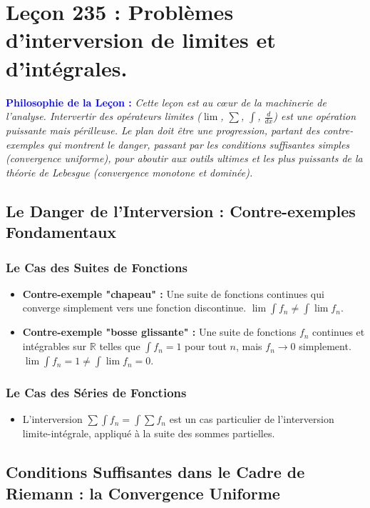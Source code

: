 \documentclass[12pt, a4paper, parskip=full]{report}
\theoremstyle{agregstyle}
\newenvironment{philosophie}
  {\par\medskip\noindent\begin{oframed}\noindent\textbf{\textcolor{blue}{Philosophie de la Leçon :}}\itshape}
  {\end{oframed}\par\medskip}
\begin{document}
\chapter{Leçon 235 : Problèmes d'interversion de limites et d'intégrales.}

\begin{philosophie}
    Cette leçon est au cœur de la machinerie de l'analyse. Intervertir des opérateurs limites ($\lim$, $\sum$, $\int$, $\frac{d}{dx}$) est une opération puissante mais périlleuse. Le plan doit être une progression, partant des contre-exemples qui montrent le danger, passant par les conditions suffisantes simples (convergence uniforme), pour aboutir aux outils ultimes et les plus puissants de la théorie de Lebesgue (convergence monotone et dominée).
\end{philosophie}

\section{Le Danger de l'Interversion : Contre-exemples Fondamentaux}
\subsection{Le Cas des Suites de Fonctions}
\begin{itemize}
    \item \textbf{Contre-exemple "chapeau" :} Une suite de fonctions continues qui converge simplement vers une fonction discontinue. $\lim \int f_n \neq \int \lim f_n$.
    \item \textbf{Contre-exemple "bosse glissante" :} Une suite de fonctions $f_n$ continues et intégrables sur $\mathbb{R}$ telles que $\int f_n = 1$ pour tout $n$, mais $f_n \to 0$ simplement. $\lim \int f_n = 1 \neq \int \lim f_n = 0$.
\end{itemize}
\subsection{Le Cas des Séries de Fonctions}
\begin{itemize}
    \item L'interversion $\sum \int f_n = \int \sum f_n$ est un cas particulier de l'interversion limite-intégrale, appliqué à la suite des sommes partielles.
\end{itemize}

\section{Conditions Suffisantes dans le Cadre de Riemann : la Convergence Uniforme}
\end{document}
